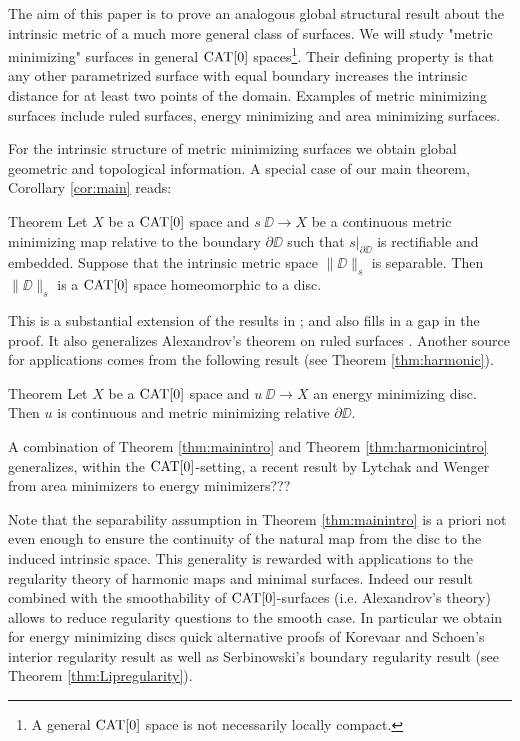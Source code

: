 \documentclass[a4paper,10pt]{amsart}
\begin{document}
The aim of this paper is to prove an analogous global structural result about the intrinsic metric of a much more general class of surfaces.
We will study "metric minimizing" surfaces in general $\mathop{\rm CAT}\nolimits[0]$ spaces\footnote{A general $\mathop{\rm CAT}\nolimits[0]$ space is not necessarily locally compact.}. 
Their defining property is that any other parametrized surface with
equal boundary increases the intrinsic distance for at least two points of the domain. Examples of metric minimizing surfaces include
ruled surfaces, energy minimizing and area minimizing surfaces. 


 For the intrinsic structure of metric minimizing surfaces 
we obtain global geometric and topological information. A special case of our main theorem, Corollary \ref{cor:main} reads:

\begin{thm}{Theorem}\label{thm:mainintro}
Let $X$ be a $\mathop{\rm CAT}\nolimits[0]$ space 
and $s\:\DD\to X$ be a continuous metric minimizing map relative to the boundary $\partial\DD$ such that $s|_{\partial\DD}$ is rectifiable
and embedded.
Suppose that the intrinsic metric space $\|\DD\|_s$  is separable. Then $\|\DD\|_s$ is a $\mathop{\rm CAT}\nolimits[0]$ space homeomorphic to a disc.
\end{thm}

This is a substantial extension of the results in \cite{petrunin-metric-min}; and also fills in a gap in the proof. 
It also generalizes Alexandrov's theorem on ruled surfaces \cite{A}.
Another source for applications comes from the following result (see Theorem \ref{thm:harmonic}).

\begin{thm}{Theorem}\label{thm:harmonicintro}
Let $X$ be a $\mathop{\rm CAT}\nolimits[0]$ space 
and $u\:\DD\to X$ an energy minimizing disc.
Then $u$ is continuous and metric minimizing relative $\partial\DD$.
\end{thm}

A combination of Theorem \ref{thm:mainintro} and Theorem \ref{thm:harmonicintro} generalizes, within the $\mathop{\rm CAT}\nolimits[0]$-setting,
a recent result by Lytchak and Wenger from area minimizers to energy minimizers???


Note that the separability assumption in Theorem \ref{thm:mainintro} is a priori not even enough to ensure the continuity of the natural 
map from the disc to the induced intrinsic space. This generality is rewarded with applications to the regularity theory of harmonic maps 
and minimal surfaces. Indeed our result combined with the smoothability of $\mathop{\rm CAT}\nolimits[0]$-surfaces (i.e. Alexandrov's theory) 
allows to reduce regularity questions to the smooth case. In particular we obtain for energy minimizing discs quick alternative proofs of Korevaar and Schoen's interior regularity
result \cite{KS} as well as Serbinowski's boundary regularity result \cite{Se} (see Theorem \ref{thm:Lipregularity}). 
\end{document}

